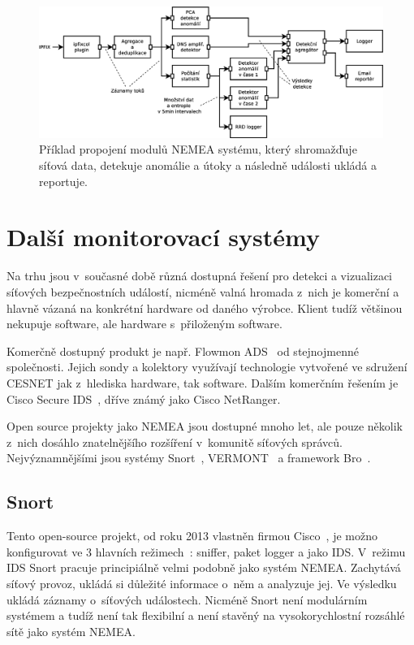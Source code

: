 \begin{figure}[h]
    \centering
    \includegraphics[width=1\textwidth]{fig/nemea-example-2-cz.eps}
    \caption{Příklad propojení modulů NEMEA systému, který shromažďuje síťová data, detekuje anomálie a útoky a následně události ukládá a reportuje.} \label{fig:nemea-example-2}
  
\end{figure}



\section{Další monitorovací systémy}

Na trhu jsou v~současné době různá dostupná řešení pro detekci a vizualizaci síťových bezpečnostních událostí, nicméně valná hromada z~nich je komerční a hlavně vázaná na konkrétní hardware od daného výrobce. Klient tudíž většinou nekupuje software, ale hardware s~přiloženým software.

Komerčně dostupný produkt je např. Flowmon ADS~\cite{flowmon:report}\cite{flowmon:ads} od stejnojmenné společnosti. Jejich sondy a kolektory využívají technologie vytvořené ve sdružení CESNET jak z~hlediska hardware, tak software. Dalším komerčním řešením je Cisco Secure IDS~\cite{cisco:ids}, dříve známý jako Cisco NetRanger.

Open source projekty jako NEMEA jsou dostupné mnoho let, ale pouze několik z~nich dosáhlo znatelnějšího rozšíření v~komunitě síťových správců. Nejvýznamnějšími jsou systémy Snort~\cite{snort}, VERMONT~\cite{vermont} a framework Bro~\cite{bro}. 

\subsection*{Snort}
Tento open-source projekt, od roku 2013 vlastněn firmou Cisco~\cite{snort:cisco}, je možno konfigurovat ve 3 hlavních režimech~\cite{snort:modes}: sniffer, paket logger a jako IDS. V~režimu IDS Snort pracuje principiálně velmi podobně jako systém NEMEA. Zachytává síťový provoz, ukládá si důležité informace o~něm a analyzuje jej. Ve výsledku ukládá záznamy o~síťových událostech. Nicméně Snort není modulárním systémem a tudíž není tak flexibilní a není stavěný na vysokorychlostní rozsáhlé sítě jako systém NEMEA.

